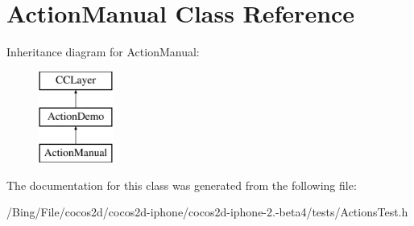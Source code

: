\hypertarget{interface_action_manual}{\section{Action\-Manual Class Reference}
\label{interface_action_manual}
}
Inheritance diagram for Action\-Manual\-:\begin{figure}[H]
\begin{center}
\leavevmode
\includegraphics[height=3.000000cm]{interface_action_manual}
\end{center}
\end{figure}


The documentation for this class was generated from the following file\-:\begin{DoxyCompactItemize}
\item 
/\-Bing/\-File/cocos2d/cocos2d-\/iphone/cocos2d-\/iphone-\/2.-\/beta4/tests/Actions\-Test.\-h\end{DoxyCompactItemize}

